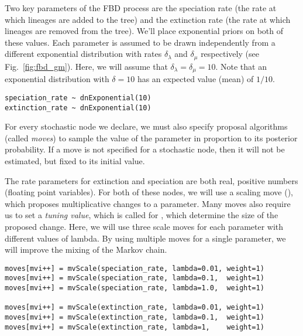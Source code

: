 Two key parameters of the FBD process are the speciation rate (the rate at which lineages are added to the tree) and the extinction rate (the rate at which lineages are removed from the tree). 
We'll place exponential priors on both of these values. 
Each parameter is assumed to be drawn independently from a different exponential distribution with rates $\delta_{\lambda}$ and $\delta_{\mu}$ respectively (see Fig.\ \ref{fig:fbd_gm}). 
Here, we will assume that $\delta_{\lambda} = \delta_{\mu} = 10$. 
Note that an exponential distribution with $\delta = 10$ has an expected value (mean) of $1/10$. 
{\tt \begin{snugshade*}
\begin{lstlisting}
speciation_rate ~ dnExponential(10)
extinction_rate ~ dnExponential(10)
\end{lstlisting}
\end{snugshade*}}

For every stochastic node we declare, we must also specify proposal algorithms (called \textit{moves}) to sample the value of the parameter in proportion to its posterior probability.
If a move is not specified for a stochastic node, then it will not be estimated, but fixed to its initial value. 

The rate parameters for extinction and speciation are both real, positive numbers (\IE floating point variables). 
For both of these nodes, we will use a scaling move (), which proposes multiplicative changes to a parameter.
Many moves also require us to set a \textit{tuning value}, which is called  for , which determine the size of the proposed change. 
Here, we will use three scale moves for each parameter with  different values of lambda. 
By using multiple moves for a single parameter, we will improve the mixing of the Markov chain. 
{\tt \begin{snugshade*}
\begin{lstlisting}
moves[mvi++] = mvScale(speciation_rate, lambda=0.01, weight=1)
moves[mvi++] = mvScale(speciation_rate, lambda=0.1,  weight=1)
moves[mvi++] = mvScale(speciation_rate, lambda=1.0,  weight=1)

moves[mvi++] = mvScale(extinction_rate, lambda=0.01, weight=1)
moves[mvi++] = mvScale(extinction_rate, lambda=0.1,  weight=1)
moves[mvi++] = mvScale(extinction_rate, lambda=1,    weight=1)
\end{lstlisting}
\end{snugshade*}}

